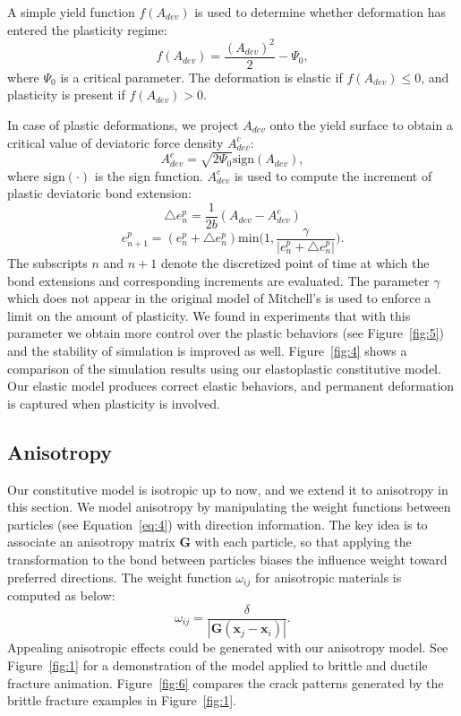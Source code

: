 A simple yield function $f(A_{dev})$ is used to determine whether deformation has entered the plasticity regime:
\begin{equation}
f(A_{dev}) = \frac{(A_{dev})^2}{2}-\Psi_0,
\label{eq:12}
\end{equation}
where $\Psi_0$ is a critical parameter. The deformation is elastic if $f(A_{dev})\leq 0$, and plasticity is present if  $f(A_{dev}) > 0$.

In case of plastic deformations, we project $A_{dev}$ onto the yield surface to obtain a critical value of deviatoric force density $A_{dev}^c$:
\begin{equation}
A_{dev}^c=\sqrt{2\Psi_0}\mathrm{sign}(A_{dev}),
\label{eq:13}
\end{equation}
where $\mathrm{sign}(\cdot)$ is the sign function. $A_{dev}^c$ is used to compute the increment of plastic deviatoric bond extension:
\begin{equation}
\triangle e_n^p = \frac{1}{2b}(A_{dev}-A_{dev}^c)
\label{eq:14}
\end{equation}
\begin{equation}
e_{n+1}^p = (e_n^p+\triangle e_n^p)\mathrm{min}\big(1,\frac{\gamma}{|e_n^p+\triangle e_n^p|}\big).
\label{eq:15}
\end{equation}
The subscripts $n$ and $n+1$ denote the discretized point of time at which the bond extensions and corresponding increments are evaluated. The parameter $\gamma$ which does not appear in the original model of Mitchell's \cite{mitchell2011nonlocal} is used to enforce a limit on the amount of plasticity. We found in experiments that with this parameter we obtain more control over the plastic behaviors (see Figure~\ref{fig:5}) and the stability of simulation is improved as well. Figure~\ref{fig:4} shows a comparison of the simulation results using our elastoplastic constitutive model. Our elastic model produces correct elastic behaviors, and permanent deformation is captured when plasticity is involved.
\subsection{Anisotropy}

Our constitutive model is isotropic up to now, and we extend it to anisotropy in this section. We model anisotropy by manipulating the weight functions between particles (see Equation~\ref{eq:4}) with direction information. The key idea is to associate an anisotropy matrix $\mathbf{G}$ with each particle, so that applying the transformation to the bond between particles biases the influence weight toward preferred directions. The weight function $\omega_{ij}$ for anisotropic materials is computed as below:
\begin{equation}
\omega_{ij}=\frac{\delta}{|\mathbf{G}(\mathbf{x}_j-\mathbf{x}_i)|}.
\label{eq:16}
\end{equation}
Appealing anisotropic effects could be generated with our anisotropy model. See Figure~\ref{fig:1} for a demonstration of the model applied to brittle and ductile fracture animation. Figure~\ref{fig:6} compares the crack patterns generated by the brittle fracture examples in Figure~\ref{fig:1}.

